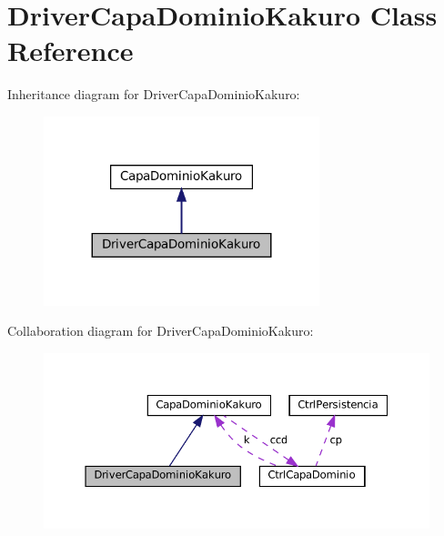 \section{Driver\+Capa\+Dominio\+Kakuro Class Reference}
\label{class_dominio_1_1controladores_1_1_drivers_1_1_driver_capa_dominio_kakuro}


Inheritance diagram for Driver\+Capa\+Dominio\+Kakuro\+:
\nopagebreak
\begin{figure}[H]
\begin{center}
\leavevmode
\includegraphics[width=227pt]{class_dominio_1_1controladores_1_1_drivers_1_1_driver_capa_dominio_kakuro__inherit__graph}
\end{center}
\end{figure}


Collaboration diagram for Driver\+Capa\+Dominio\+Kakuro\+:
\nopagebreak
\begin{figure}[H]
\begin{center}
\leavevmode
\includegraphics[width=350pt]{class_dominio_1_1controladores_1_1_drivers_1_1_driver_capa_dominio_kakuro__coll__graph}
\end{center}
\end{figure}
